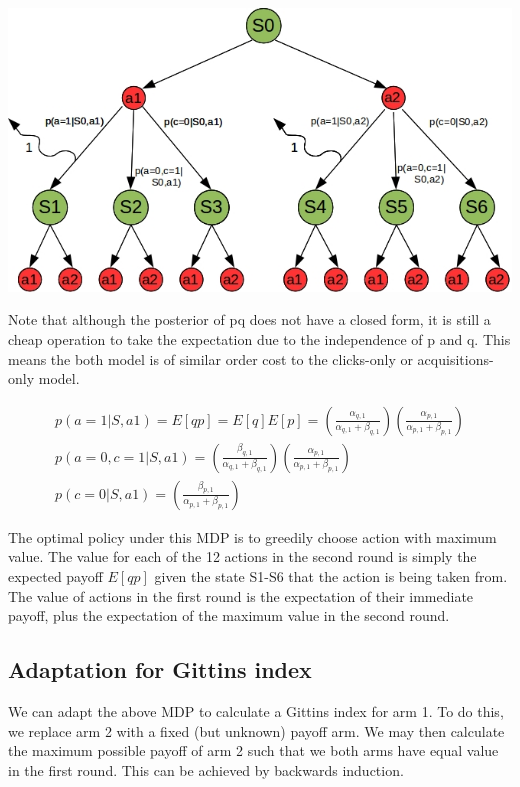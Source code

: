 \documentclass[11pt,a4,singlespacing,titlepagenumber=on]{scrreprt}
\numberwithin{equation}{chapter} %
\theoremstyle{remark}
\begin{document}
\includegraphics[scale=0.6]{BAMDP.jpg}

Note that although the posterior of pq does not have a closed form, it is still a cheap operation to take the expectation due to the independence of p and q. This means the both model is of similar order cost to the clicks-only or acquisitions-only model.

\begin{align}
	p(a=1|S,a1) = E[qp] = E[q]E[p] = 
		\left( \frac{ \alpha_{q,1} }{ \alpha_{q,1} + \beta_{q,1} } \right)
		\left( \frac{ \alpha_{p,1} }{ \alpha_{p,1} + \beta_{p,1} } \right) \\
	p(a=0,c=1|S,a1) = 
		\left( \frac{ \beta_{q,1} }{ \alpha_{q,1} + \beta_{q,1} } \right)
		\left( \frac{ \alpha_{p,1} }{ \alpha_{p,1} + \beta_{p,1} } \right) \\
	p(c=0|S,a1) = 
		\left( \frac{ \beta_{p,1} }{ \alpha_{p,1} + \beta_{p,1} } \right) 
\end{align}	

The optimal policy under this MDP is to greedily choose action with maximum value. The value for each of the 12 actions in the second round is simply the expected payoff $E[qp]$ given the state S1-S6 that the action is being taken from. The value of actions in the first round is the expectation of their immediate payoff, plus the expectation of the maximum value in the second round.

\subsection{Adaptation for Gittins index}

We can adapt the above MDP to calculate a Gittins index for arm 1. To do this, we replace arm 2 with a fixed (but unknown) payoff arm. We may then calculate the maximum possible payoff of arm 2 such that we both arms have equal value in the first round. This can be achieved by backwards induction.
\end{document}
